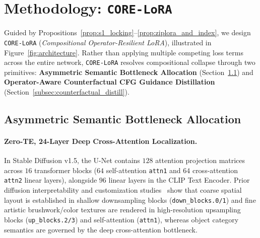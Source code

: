 \documentclass[10pt,twocolumn,letterpaper]{article}
\begin{document}
\section{Methodology: \texttt{CORE-LoRA}}
\label{sec:method}

Guided by Propositions~\ref{prop:s1_locking}--\ref{prop:ziplora_and_index}, we design \texttt{CORE-LoRA} (\textit{Compositional Operator-Resilient LoRA}), illustrated in Figure~\ref{fig:architecture}. Rather than applying multiple competing loss terms across the entire network, \texttt{CORE-LoRA} resolves compositional collapse through two primitives: \textbf{Asymmetric Semantic Bottleneck Allocation} (Section~\ref{subsec:bottleneck_allocation}) and \textbf{Operator-Aware Counterfactual CFG Guidance Distillation} (Section~\ref{subsec:counterfactual_distill}).

\subsection{Asymmetric Semantic Bottleneck Allocation}
\label{subsec:bottleneck_allocation}

\paragraph{Zero-TE, 24-Layer Deep Cross-Attention Localization.}
In Stable Diffusion v1.5, the U-Net contains $128$ attention projection matrices across $16$ transformer blocks ($64$ self-attention \texttt{attn1} and $64$ cross-attention \texttt{attn2} linear layers), alongside $96$ linear layers in the CLIP Text Encoder. Prior diffusion interpretability and customization studies~\cite{frenkel2024blora,badblocks2025,ouyang2025klora} show that coarse spatial layout is established in shallow downsampling blocks (\texttt{down\_blocks.0/1}) and fine artistic brushwork/color textures are rendered in high-resolution upsampling blocks (\texttt{up\_blocks.2/3}) and self-attention (\texttt{attn1}), whereas object category semantics are governed by the deep cross-attention bottleneck.
\end{document}
